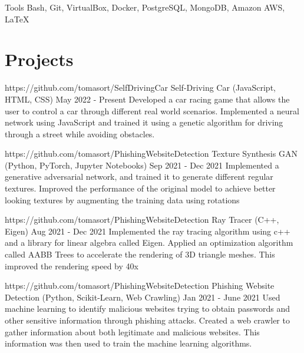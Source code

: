 \documentclass[letterpaper,10pt]{article}
\begin{document}
  \skillItem
    {Tools}
    {Bash, 
      Git, 
      VirtualBox, 
      Docker, 
      PostgreSQL, 
      MongoDB, 
      Amazon AWS, 
      \LaTeX\ }
  \vspace{3pt}
\sectionEnd

\section{Projects}
\sectionStart

  \projectHeading
    {https://github.com/tomasort/SelfDrivingCar}
    {Self-Driving Car}
    {(JavaScript, HTML, CSS)}
    {May 2022 - Present}
  \listStart
    \bulletItem
      {Developed a car racing game that allows the user to control a car through different real world scenarios.}
    \bulletItem
      {Implemented a neural network using JavaScript and trained it using a genetic algorithm for driving through a street while avoiding obstacles.}
  \listEnd

  \projectHeading
    {https://github.com/tomasort/PhishingWebsiteDetection}
    {Texture Synthesis GAN}
    {(Python, PyTorch, Jupyter Notebooks)}
    {Sep 2021 - Dec 2021}
  \listStart
    \bulletItem
      {Implemented a generative adversarial network, and trained it to generate different regular textures.}
    \bulletItem
      {Improved the performance of the original model to achieve better looking textures by augmenting the training data using rotations }
  \listEnd


  \projectHeading
    {https://github.com/tomasort/PhishingWebsiteDetection}
    {Ray Tracer}
    {(C++, Eigen)}
    {Aug 2021 - Dec 2021}
  \listStart
    \bulletItem
      {Implemented the ray tracing algorithm using c++ and a library for linear algebra called Eigen.}
    \bulletItem
      {Applied an optimization algorithm called AABB Trees to accelerate the rendering of 3D triangle meshes. This improved the rendering speed by 40x}
  \listEnd

  \projectHeading
    {https://github.com/tomasort/PhishingWebsiteDetection}
    {Phishing Website Detection}
    {(Python, Scikit-Learn, Web Crawling)}
    {Jan 2021 - June 2021}
  \listStart
    \bulletItem
      {Used machine learning to identify malicious websites trying to obtain passwords and other sensitive information through phishing attacks. }
    \bulletItem
      {Created a web crawler to gather information about both legitimate and malicious websites. This information was then used to train the machine learning algorithms. }
  \listEnd
\end{document}
